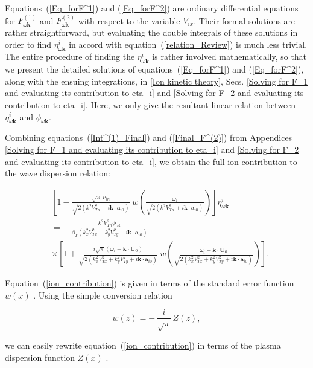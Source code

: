 \documentclass[draft]{agujournal2019}
\renewcommand{\vec}{\mathbf}
\begin{document}
Equations~(\ref{Eq_forF^1}) and (\ref{Eq_forF^2}) are
ordinary differential equations for $F_{\omega\vec{k}}^{(1)}$ and $F_{\omega\vec{k}}^{(2)}$ with respect to the
variable $V_{ix}$. Their formal solutions are rather straightforward, but
evaluating the double integrals of these solutions in order to find $\eta
_{\omega\vec{k}}^{i}$ in accord with equation~(\ref{relation_Review}) is much less trivial. The entire procedure of finding
the $\eta_{\omega\vec{k}}^{i}$ is rather involved mathematically, so that
we present the detailed solutions of equations~(\ref{Eq_forF^1}) and
(\ref{Eq_forF^2}), along with the ensuing integrations, in \ref{Ion kinetic theory}, Secs.
\ref{Solving for F_1 and evaluating its contribution to eta_i} and
\ref{Solving for F_2 and evaluating its contribution to eta_i}. Here, we only
give the resultant linear relation between $\eta_{\omega\vec{k}}^{i}$ and
$\phi_{\omega\vec{k}}$.

Combining equations~(\ref{Int^(1)_Final}) and (\ref{Final_F^(2)}) from Appendices
\ref{Solving for F_1 and evaluating its contribution to eta_i} and
\ref{Solving for F_2 and evaluating its contribution to eta_i}, we obtain the full ion contribution to the wave dispersion
relation:
\begin{linenomath*}
\begin{align}
&  \left[  1-\frac{\sqrt{\pi}\ \nu_{in}}{\sqrt{2(k^{2}V_{Tn}^{2}+i\vec{k}%
\cdot\vec{a}_{i0})}}\ w\left(  \frac{\omega_{i}}{\sqrt{2(k^{2}V_{Tn}%
^{2}+i\vec{k}\cdot\vec{a}_{i0})}}\right)  \right]  \eta_{\omega\vec{k}}%
^{i}\nonumber\\
&  =-\ \frac{k^{2}V_{Tn}^{2}\phi_{\omega k}}{\beta_{T}(k_{x}%
^{2}V_{Tx}^{2}+k_{y}^{2}V_{Ty}^{2}+i\vec{k}\cdot\vec{a}_{i0}%
)}\nonumber\\
&  \times\left[  1+\frac{i\sqrt{\pi}(\omega_{i}-\vec{k}\cdot\vec{U}_{0})}%
{\sqrt{2(k_{x}^{2}V_{Tx}^{2}+k_{y}^{2}V_{Ty}^{2}%
+i\vec{k}\cdot\vec{a}_{i0})}}\ w\left(  \frac{\omega_{i}-\vec{k}\cdot\vec{U}%
_{0}}{\sqrt{2(k_{x}^{2}V_{Tx}^{2}+k_{y}^{2}V_{Ty}%
^{2}+i\vec{k}\cdot\vec{a}_{i0})}}\right)  \right].
\label{ion_contribution}
\end{align}
\end{linenomath*}
Equation~(\ref{ion_contribution}) is given in terms of the standard error
function $w(x)$ \cite{Abramowitz:Handbook88}. Using the simple
conversion relation
\begin{linenomath*}
\begin{equation}
w(z)=-\,\frac{i}{\sqrt{\pi}}\,Z(z),
\label{w(x)->Z(x)}
\end{equation}
\end{linenomath*}
we can easily rewrite equation~(\ref{ion_contribution}) in terms of the plasma
dispersion function $Z(x)$ \cite{Fried:Plasma61}. 
\end{document}
